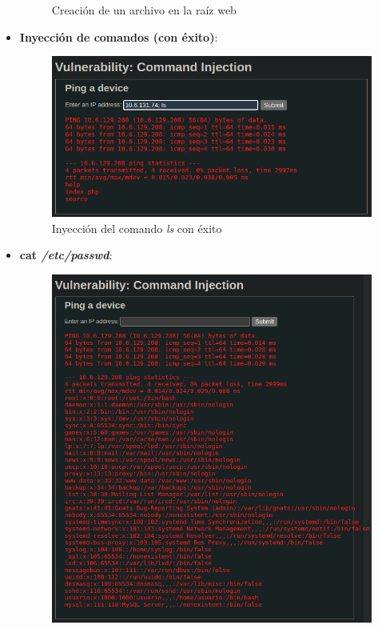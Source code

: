 \documentclass[11pt]{report}
\begin{document}
\begin{itemize}
\begin{figure}[H]
          \caption{Creación de un archivo en la raíz web}
        \end{figure}
  \item \textbf{Inyección de comandos (con éxito)}:
        \begin{figure}[H]
          \centering
          \includegraphics[scale=0.5]{img/UbuntuServer/UbuntuServer_Base_3.png}
          \caption{Inyección del comando \emph{ls} con éxito}
        \end{figure}
  \item \textbf{cat \emph{/etc/passwd}}:
        \begin{figure}[H]
          \centering
          \includegraphics[scale=0.43]{img/UbuntuServer/UbuntuServer_Base_4.png}

\end{figure}
\end{itemize}
\end{document}
